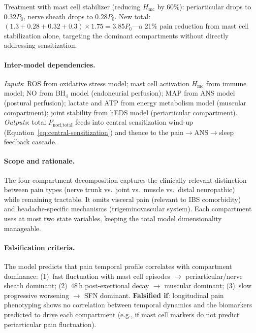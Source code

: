 Treatment with mast cell stabilizer (reducing $H_{\text{mc}}$ by 60\%): periarticular drops to $0.32 P_0$, nerve sheath drops to $0.28 P_0$. New total: $(1.3 + 0.28 + 0.32 + 0.3) \times 1.75 = 3.85 P_0$---a 21\% pain reduction from mast cell stabilization alone, targeting the dominant compartments without directly addressing sensitization.

\paragraph{Inter-model dependencies.}
\emph{Inputs}: ROS from oxidative stress model; mast cell activation $H_{\text{mc}}$ from immune model; NO from BH$_4$ model (endoneurial perfusion); MAP from ANS model (postural perfusion); lactate and ATP from energy metabolism model (muscular compartment); joint stability from hEDS model (periarticular compartment). \emph{Outputs}: total $P_{\text{noci,total}}$ feeds into central sensitization wind-up (Equation~\ref{eq:central-sensitization}) and thence to the pain$\to$ANS$\to$sleep feedback cascade.

\paragraph{Scope and rationale.}
The four-compartment decomposition captures the clinically relevant distinction between pain types (nerve trunk vs.\ joint vs.\ muscle vs.\ distal neuropathic) while remaining tractable. It omits visceral pain (relevant to IBS comorbidity) and headache-specific mechanisms (trigeminovascular system). Each compartment uses at most two state variables, keeping the total model dimensionality manageable.

\paragraph{Falsification criteria.}
The model predicts that pain temporal profile correlates with compartment dominance: (1)~fast fluctuation with mast cell episodes $\to$ periarticular/nerve sheath dominant; (2)~48\,h post-exertional decay $\to$ muscular dominant; (3)~slow progressive worsening $\to$ SFN dominant. \textbf{Falsified if}: longitudinal pain phenotyping shows no correlation between temporal dynamics and the biomarkers predicted to drive each compartment (e.g., if mast cell markers do not predict periarticular pain fluctuation).

